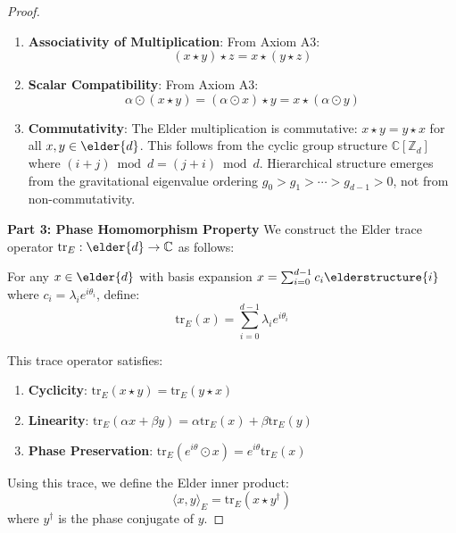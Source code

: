 \begin{proof}
\begin{enumerate}
    \item \textbf{Associativity of Multiplication}: From Axiom A3:
    \begin{equation}
    (x \star y) \star z = x \star (y \star z)
    \end{equation}
    
    \item \textbf{Scalar Compatibility}: From Axiom A3:
    \begin{equation}
    \alpha \odot (x \star y) = (\alpha \odot x) \star y = x \star (\alpha \odot y)
    \end{equation}
    
    \item \textbf{Commutativity}: The Elder multiplication is commutative: $x \star y = y \star x$ for all $x, y \in \elder{d}$. This follows from the cyclic group structure $\mathbb{C}[\mathbb{Z}_d]$ where $(i+j) \bmod d = (j+i) \bmod d$. Hierarchical structure emerges from the gravitational eigenvalue ordering $g_0 > g_1 > \cdots > g_{d-1} > 0$, not from non-commutativity.
\end{enumerate}

\textbf{Part 3: Phase Homomorphism Property}
We construct the Elder trace operator $\mathrm{tr}_E: \elder{d} \rightarrow \mathbb{C}$ as follows:

For any $x \in \elder{d}$ with basis expansion $x = \sum_{i=0}^{d-1} c_i \elderstructure{i}$ where $c_i = \lambda_i e^{i\theta_i}$, define:
\begin{equation}
\mathrm{tr}_E(x) = \sum_{i=0}^{d-1} \lambda_i e^{i\theta_i}
\end{equation}

This trace operator satisfies:
\begin{enumerate}
    \item \textbf{Cyclicity}: $\mathrm{tr}_E(x \star y) = \mathrm{tr}_E(y \star x)$
    \item \textbf{Linearity}: $\mathrm{tr}_E(\alpha x + \beta y) = \alpha \mathrm{tr}_E(x) + \beta \mathrm{tr}_E(y)$
    \item \textbf{Phase Preservation}: $\mathrm{tr}_E(e^{i\theta} \odot x) = e^{i\theta} \mathrm{tr}_E(x)$
\end{enumerate}

Using this trace, we define the Elder inner product:
\begin{equation}
\langle x, y \rangle_E = \mathrm{tr}_E(x \star y^{\dagger})
\end{equation}
where $y^{\dagger}$ is the phase conjugate of $y$.


\end{proof}
